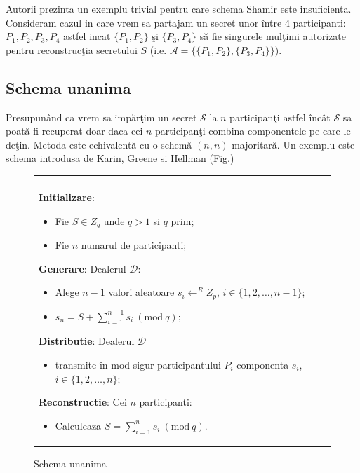 \documentclass{llncs}
\newcommand{\Mod}[1]{\ (\text{mod}\ #1)}
\begin{document}
Autorii prezinta un exemplu trivial pentru care schema Shamir este insuficienta. Consideram cazul in care vrem sa partajam un secret unor \^{i}ntre 4 participanti: $P_1, P_2, P_3, P_4$ astfel incat $\{P_1,P_2\}$ \c{s}i $\{P_3,P_4\}$ s\u{a} fie singurele mul\c{t}imi autorizate pentru reconstruc\c{t}ia secretului $S$ (i.e. $\mathcal{A} = \{ \{P_1,P_2\}, \{P_3,P_4\} \}$).

\subsection{Schema unanima}

Presupun\^{a}nd ca vrem sa imp\u{a}r\c{t}im un secret $\mathcal{S}$ la $n$ participan\c{t}i astfel \^{i}nc\^{a}t $\mathcal{S}$ sa poat\u{a} fi recuperat doar daca cei $n$ participan\c{t}i combina componentele pe care le de\c{t}in. Metoda este echivalent\u{a} cu o schem\u{a} $(n, n)$ majoritar\u{a}. Un exemplu este schema introdusa de Karin, Greene si Hellman \cite{Karnin:83} (Fig.\label{fig:all_or_nothing})


\begin{figure}[h!]

\begin{tabular}{|p{\textwidth}|}
\hline

\\
\hspace{.1in}
\textbf{Initializare}: 
	\begin{itemize}
		\item Fie $S \in Z_q$ unde $q > 1 $ si $q$ prim;
		\item Fie $n$ numarul de participanti;
	\end{itemize}
\medskip

\hspace{.1in}
\textbf{Generare}: Dealerul $\mathcal{D}$:
	\begin{itemize}
		\setlength{\itemsep}{5pt}
		\item Alege $n - 1$ valori aleatoare $s_i \leftarrow^R Z_p$, $i \in \{1,2,\dots,{n-1}\}$;
		\item $s_n = S + \sum\limits_{i=1}^{n-1} s_i \Mod q $;
	\end{itemize}
\medskip

\hspace{.1in}
\textbf{Distributie}: Dealerul $\mathcal{D}$
	\begin{itemize}
		\item transmite \^{i}n mod sigur participantului $P_i$ componenta $s_i$, $i \in \{1,2,\dots,n\}$;
	\end{itemize}

\hspace{.1in}
\textbf{Reconstructie}: Cei $n$ participanti:
	\begin{itemize}
		\item Calculeaza $S = \sum\limits_{i=1}^{n} s_i \Mod q$.
	\end{itemize}

\\
\hline
\end{tabular}
\caption{Schema unanima \cite{Karnin:83}}
\label{fig:all_or_nothing}
\end{figure}
\end{document}
